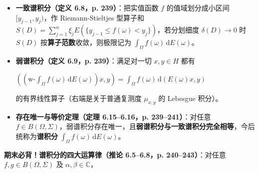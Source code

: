 \documentclass[11pt,a4paper]{article}
\providecommand{\tightlist}{\setlength{\itemsep}{1.8pt}\setlength{\parskip}{0pt}}
\newcommand{\FitDisplayMath}[1]{%
  \par\vspace{4pt}\noindent
  \begin{adjustbox}{max width=\linewidth, center}
    $\displaystyle #1$
  \end{adjustbox}
  \par\vspace{4pt}%
}
\begin{document}
\begin{itemize}
\tightlist
\item
  \textbf{一致谱积分（定义 6.8，p. 239）}：把实值函数 \(f\) 的值域划分成小区间 \([y_{j-1}, y_j)\)，作 Riemann-Stieltjes 型算子和 \(S(D) = \sum_{j=1}^n \xi_j E(\{y_{j-1} \le f(\omega) < y_j\})\)，若分划细度 \(\delta(D) \to 0\) 时 \(S(D)\) 按\textbf{算子范数}收敛，则极限记为 \(\int_\Omega f(\omega)\,\mathrm{d}E(\omega)\)。
\item
  \textbf{弱谱积分（定义 6.9，p. 239）}：满足对一切 \(x, y \in H\) 都有 
\FitDisplayMath{\left(\left(\mathrm{w\text{-}}\int_\Omega f(\omega)\,\mathrm{d}E(\omega)\right)x, y\right) = \int_\Omega f(\omega)\,\mathrm{d}(E(\omega)x, y)}
 的有界线性算子（右端是关于普通复测度 \(\mu_{x,y}\) 的 Lebesgue 积分）。
\item
  \textbf{存在唯一与等价定理（定理 6.15--6.16，p. 239--241）}：对任意 \(f \in B(\Omega, \Sigma)\)，弱谱积分存在唯一，且\textbf{弱谱积分与一致谱积分完全相等}，今后统称为\textbf{谱积分} \(\int_\Omega f(\omega)\,\mathrm{d}E(\omega)\)。
\end{itemize}

\textbf{期末必背！谱积分的四大运算律（推论 6.5--6.8，p. 240--243）}：对任意 \(f, g \in B(\Omega, \Sigma)\) 及 \(\alpha, \beta \in \mathbb{C}\)，
\end{document}
